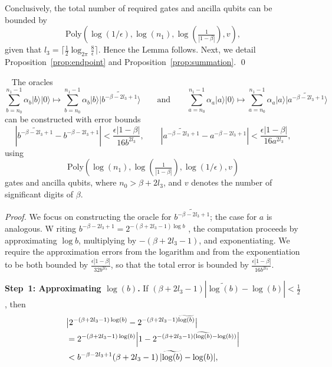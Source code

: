 \documentclass[aps,pra,twocolumn,superscriptaddress,preprintnumbers,amsmath,amssymb]{revtex4-2}
\begin{document}
Conclusively, the total number of required gates and ancilla qubits can be bounded by 
\begin{equation}
\mathrm{Poly}(\log(1/\epsilon),\log(n_1),\log(\tfrac{1}{|1-\beta|}),v),
\end{equation}
given that $l_3=\lceil\frac{1}{2}\log_{2\pi}\frac{8}{\epsilon}\rceil$. Hence the Lemma follows. Next, we  detail Proposition~\ref{prop:endpoint} and Proposition~\ref{prop:summation}.  \qed
\begin{proposition}~\label{prop:endpoint}
    The oracles
    \begin{equation}
        \sum_{b=n_0}^{n_1-1}\alpha_b|b\rangle|0\rangle\mapsto \sum_{b=n_0}^{n_1-1}\alpha_b|b\rangle |\widetilde{b^{-\beta-2l_3+1}}\rangle \qquad\mathrm{and}\qquad \sum_{a=n_0}^{n_1-1}\alpha_a|a\rangle|0\rangle\mapsto \sum_{a=n_0}^{n_1-1}\alpha_a|a\rangle |\widetilde{a^{-\beta-2l_3+1}}\rangle
    \end{equation}
    can be constructed with error bounds
    \begin{equation}
      |\widetilde{b^{-\beta-2l_3+1}}-b^{-\beta-2l_3+1}|<\frac{\epsilon |1-\beta|}{16{b^{2l_3}}}, \qquad|\widetilde{a^{-\beta-2l_3+1}}-a^{-\beta-2l_3+1}|<\frac{\epsilon |1-\beta|}{16{a^{2l_3}}},
  \end{equation}
 using
    \begin{equation}
            \mathrm{Poly}(\log(n_1),\log(\tfrac{1}{|1-\beta|}),\log(1/\epsilon),v)
    \end{equation}
    gates and ancilla qubits, where $n_0>\beta+2l_3$, and $v$ denotes the number of significant digits of $\beta$.
\end{proposition}
\noindent\textit{Proof.} We focus on constructing the oracle for \( \widetilde{b^{-\beta - 2 l_3 + 1}} \); the case for \( a \) is analogous.  W riting \( b^{-\beta - 2 l_3 + 1} = 2^{-(\beta + 2 l_3 - 1) \log b} \) , the computation proceeds by approximating \( \log b \), multiplying by \( -(\beta + 2 l_3 - 1) \), and exponentiating. We require the approximation errors from the logarithm and from the exponentiation to be both bounded by $\frac{\epsilon |1-\beta|}{32{b^{2l_3}}}$, so that the total error is bounded by $\frac{\epsilon |1-\beta|}{16{b^{2l_3}}}$.\par
\textbf{Step~1: Approximating \boldmath$\log(b)$.} 
If $(\beta+2
l_3-1)|\widetilde{\log(b)}-\log(b)|<\frac{1}{2}$, then
\begin{align}
&\bigl|2^{-(\beta+2l_3-1)\log(b)}-2^{-(\beta+2l_3-1)\widetilde{\log(b)}}\bigr| \notag\\
&=2^{-(\beta+2l_3-1)\log(b)}
\Bigl|1-2^{-(\beta+2l_3-1)(\widetilde{\log(b)}-\log(b))}\Bigr| \notag\\
&< b^{-\beta-2l_3+1}(\beta+2l_3-1)\,|\widetilde{\log(b)}-\log(b)|,
\end{align}
\end{document}

